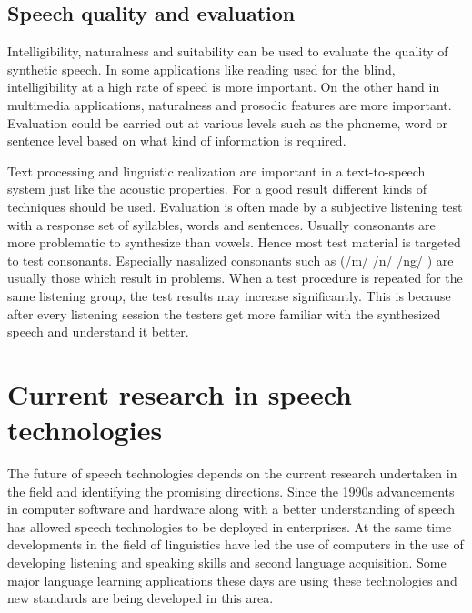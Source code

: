 \documentclass[11pt,a4paper,oneside,article]{memoir}
\begin{document}
\section{Speech quality and evaluation}
Intelligibility, naturalness and suitability can be used to evaluate the quality of synthetic speech. In some applications like reading used for the blind, intelligibility at a high rate of speed is more important. On the other hand in multimedia applications, naturalness and prosodic features are more important. Evaluation could be carried out at various levels such as the phoneme, word or sentence level based on what kind of information is required. \cite{hut}

Text processing and linguistic realization are important in a text-to-speech system just like the acoustic properties. For a good result different kinds of techniques should be used. Evaluation is often made by a subjective listening test with a response set of syllables, words and sentences. Usually consonants are more problematic to synthesize than vowels. Hence most test material is targeted to test consonants. Especially nasalized consonants such as (/m/ /n/ /ng/ ) are usually those which result in problems. 
When a test procedure is repeated for the same listening group, the test results may increase significantly. This is because after every listening session the testers get more familiar with the synthesized speech and understand it better. \cite{hut}

 
\clearpage
\chapter{Current research in speech technologies}
The future of speech technologies depends on the current research undertaken in the field and identifying the promising directions.
Since the 1990s advancements in computer software and hardware along with a better understanding of speech has allowed speech technologies to be deployed in enterprises. At the same time developments in the field of linguistics have led the use of computers in the use of developing listening and speaking skills and second language acquisition. Some major language learning applications these days are using these technologies and new standards are being developed in this area. \cite{rob}
\end{document}
